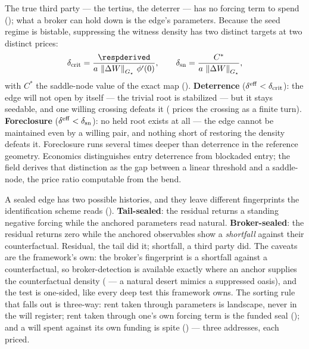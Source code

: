 \documentclass[../main]{subfiles}
\begin{document}
\begin{theorem}%
  The true third party --- the tertius, the deterrer --- has no forcing term to spend
  (); what a broker can hold down is the edge's parameters. Because the
  seed regime is bistable, suppressing the witness density has two distinct targets at
  two distinct prices:
  \begin{equation}
    \delta_{\mathrm{crit}}
      =\frac{\respderived}{\hingeA\,\normG{\surplus}\,\bendfn'(0)},
    \qquad
    \delta_{\mathrm{sn}}
      =\frac{C^{*}}{\hingeA\,\normG{\surplus}},
    \label{eq:J:broker}
  \end{equation}
  with $C^{*}$ the saddle-node value of the exact map ().
  \textbf{Deterrence} ($\effdensity<\delta_{\mathrm{crit}}$): the edge will not open by
  itself --- the trivial root is stabilized --- but it stays seedable, and one willing
  crossing defeats it ( prices the crossing as a finite turn).
  \textbf{Foreclosure} ($\effdensity<\delta_{\mathrm{sn}}$): no held root exists at all
  --- the edge cannot be maintained even by a willing pair, and nothing short of
  restoring the density defeats it. Foreclosure runs several times deeper than
  deterrence in the reference geometry. Economics distinguishes entry deterrence from
  blockaded entry; the field derives that distinction as the gap between a linear
  threshold and a saddle-node, the price ratio computable from the bend.
\end{theorem}

\begin{corollary}
  A sealed edge has two possible histories, and they leave different fingerprints the
  identification scheme reads (). \textbf{Tail-sealed}: the residual
  returns a standing negative forcing while the anchored parameters read natural.
  \textbf{Broker-sealed}: the residual returns zero while the anchored observables show
  a \emph{shortfall} against their counterfactual. Residual, the tail did it;
  shortfall, a third party did. The caveats are the framework's own: the broker's
  fingerprint is a shortfall against a counterfactual, so broker-detection is available
  exactly where an anchor supplies the counterfactual density ( --- a
  natural desert mimics a suppressed oasis), and the test is one-sided, like every
  deep test this framework owns. The sorting rule that falls out is three-way: rent
  taken through parameters is landscape, never in the will register; rent taken
  through one's own forcing term is the funded seal (); and a will
  spent against its own funding is spite () --- three addresses, each
  priced.
\end{corollary}
\end{document}
